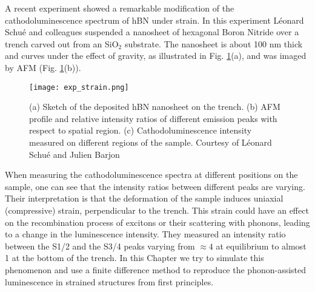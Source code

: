 A recent experiment showed a remarkable modification of the cathodoluminescence spectrum of hBN under strain.\cite{schue2017proprietes} In this experiment Léonard Schué and colleagues suspended a nanosheet of hexagonal Boron Nitride over a trench carved out from an SiO$_2$ substrate. The nanosheet is about 100 nm thick and curves under the effect of gravity, as illustrated in Fig. \ref{fig:exp_strain}(a), and was imaged by \acrfull{AFM} (Fig. \ref{fig:exp_strain}(b)).
\begin{figure}[tb]
	\vspace{0.2cm}
	\setcapindent{2em}
	\centering
	\texttt{[image: exp\_strain.png]}
	\caption{(a) Sketch of the deposited hBN nanosheet on the trench. (b) AFM profile and relative intensity ratios of different emission peaks with respect to spatial region. (c) Cathodoluminescence intensity measured on different regions of the sample. Courtesy of Léonard Schué and Julien Barjon}
	\label{fig:exp_strain} 
\end{figure}
When measuring the cathodoluminescence spectra at different positions on the sample, one can see that the intensity ratios between different peaks are varying. Their interpretation is that the deformation of the sample induces uniaxial (compressive) strain, perpendicular to the trench. This strain could have an effect on the recombination process of excitons or their scattering with phonons, leading to a change in the luminescence intensity. They measured an intensity ratio between the S1/2 and the S3/4 peaks varying from $\approx 4$ at equilibrium to almost 1 at the bottom of the trench. In this Chapter we try to simulate this phenomenon and use a finite difference method to reproduce the phonon-assisted luminescence in strained structures from first principles.

%
